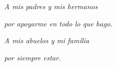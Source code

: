 \pagebreak


\begin{flushright} 
\textit{A mis padres y mis hermanos}

\textit{por apoyarme en todo lo que hago.}

\textit{ }

\textit{A mis abuelos y mi família}

\textit{por siempre estar.}

\end{flushright}
\newpage

